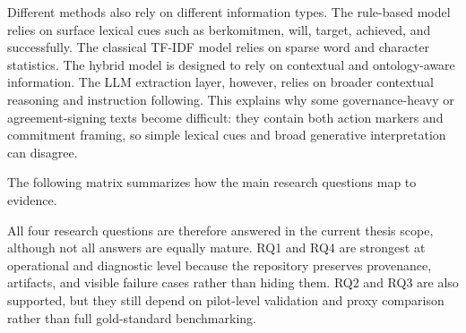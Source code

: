 Different methods also rely on different information types. The rule-based model relies on surface lexical cues such as berkomitmen, will, target, achieved, and successfully. The classical TF-IDF model relies on sparse word and character statistics. The hybrid model is designed to rely on contextual and ontology-aware information. The LLM extraction layer, however, relies on broader contextual reasoning and instruction following. This explains why some governance-heavy or agreement-signing texts become difficult: they contain both action markers and commitment framing, so simple lexical cues and broad generative interpretation can disagree.

The following matrix summarizes how the main research questions map to evidence.

All four research questions are therefore answered in the current thesis scope, although not all answers are equally mature. RQ1 and RQ4 are strongest at operational and diagnostic level because the repository preserves provenance, artifacts, and visible failure cases rather than hiding them. RQ2 and RQ3 are also supported, but they still depend on pilot-level validation and proxy comparison rather than full gold-standard benchmarking.

